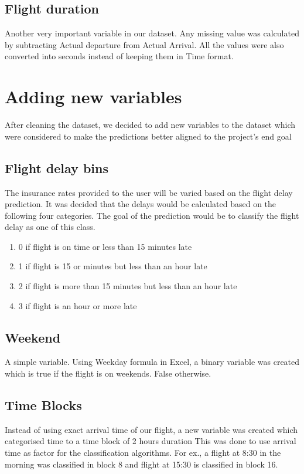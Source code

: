 \subsection{Flight duration}
Another very important variable in our dataset. Any missing value was calculated by subtracting Actual departure from Actual Arrival. All the values were also converted into seconds instead of keeping them in Time format.

\section{Adding new variables}
After cleaning the dataset, we decided to add new variables to the dataset which were considered to make the predictions better aligned to the project's end goal

\subsection{Flight delay bins}
The insurance rates provided to the user will be varied based on the flight delay prediction. It was decided that the delays would be calculated based on the following four categories. The goal of the prediction would be to classify the flight delay as one of this class.
\begin{enumerate}
    \item 0 if flight is on time or less than 15 minutes late
    \item 1 if flight is 15 or minutes but less than an hour late
    \item 2 if flight is more than 15 minutes but less than an hour late
    \item 3 if flight is an hour or more late
\end{enumerate}

\subsection{Weekend}
A simple variable. Using Weekday formula in Excel, a binary variable was created which is true if the flight is on weekends. False otherwise.

\subsection{Time Blocks}
Instead of using exact arrival time of our flight, a new variable was created which categorised time to a time block of 2 hours duration This was done to use arrival time as factor for the classification algorithms. For ex., a flight at 8:30 in the morning was classified in block 8 and flight at 15:30 is classified in block 16.

